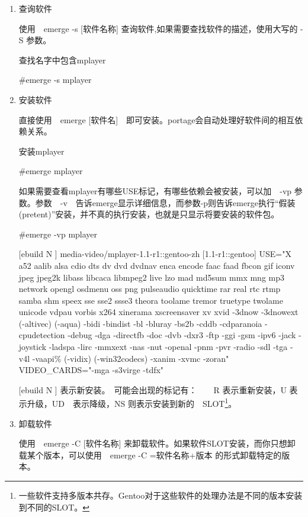 \begin{enumerate}
\item 查询软件　

使用　emerge -s [软件名称] 查询软件,如果需要查找软件的描述，使用大写的 -S 参数。
\begin{example}{查找名字中包含mplayer}
\begin{code}
\#emerge -s mplayer
\end{code}
\end{example}

\item 安装软件

直接使用　emerge [软件名]　即可安装。portage会自动处理好软件间的相互依赖关系。

\begin{example}{安装mplayer}
\begin{code}
\#emerge mplayer
\end{code}
\end{example}

如果需要查看mplayer有哪些USE标记，有哪些依赖会被安装，可以加　-vp 参数。参数　-v　告诉emerge显示详细信息，而参数-p则告诉emerge执行“假装(pretent)”安装，并不真的执行安装，也就是只显示将要安装的软件包。

\begin{code}
\#emerge -vp mplayer　

[ebuild   N    ] media-video/mplayer-1.1-r1::gentoo-zh [1.1-r1::gentoo] USE="X a52 aalib alsa cdio dts dv dvd dvdnav enca encode faac faad fbcon gif iconv jpeg jpeg2k libass libcaca libmpeg2 live lzo mad md5sum mmx mng mp3 network opengl osdmenu oss png pulseaudio quicktime rar real rtc rtmp samba shm speex sse sse2 ssse3 theora toolame tremor truetype twolame unicode vdpau vorbis x264 xinerama xscreensaver xv xvid -3dnow -3dnowext (-altivec) (-aqua) -bidi -bindist -bl -bluray -bs2b -cddb -cdparanoia -cpudetection -debug -dga -directfb -doc -dvb -dxr3 -ftp -ggi -gsm -ipv6 -jack -joystick -ladspa -lirc -mmxext -nas -nut -openal -pnm -pvr -radio -sdl -tga -v4l -vaapi\% (-vidix) (-win32codecs) -xanim -xvmc -zoran" VIDEO\_CARDS="-mga -s3virge -tdfx"
\end{code}

[ebuild   N   ] 表示新安装。　可能会出现的标记有：　　R 表示重新安装，U 表示升级，UD　表示降级，NS 则表示安装到新的　SLOT\footnote{一些软件支持多版本共存。Gentoo对于这些软件的处理办法是不同的版本安装到不同的SLOT。}。

\item 卸载软件

使用　emerge -C [软件名称] 来卸载软件。如果软件SLOT安装，而你只想卸载某个版本，可以使用　emerge -C =软件名称+版本 的形式卸载特定的版本。



\end{enumerate}
